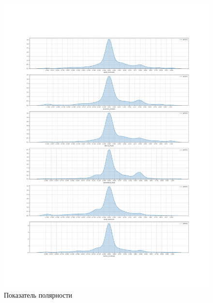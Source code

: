 \documentclass[11pt]{article}
\begin{document}
\begin{figure}
\centering
\includegraphics[width=\textwidth]{polarity.png}
\caption{Показатель полярности}\label{polarity}
\end{figure}
\end{document}
